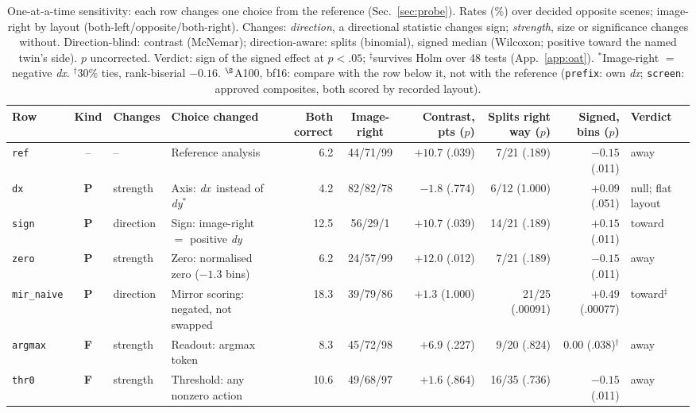 \documentclass[conference]{IEEEtran}
\newcommand{\dy}{\textit{dy}}
\newcommand{\dx}{\textit{dx}}
\newcommand{\rowid}[1]{\texttt{#1}}
\newcommand{\pit}{\textcolor{pitc}{\textbf{P}}}
\newcommand{\frk}{\textcolor{forkc}{\textbf{F}}}
\begin{document}
\begin{table}[t]
\centering
\scriptsize
\setlength{\tabcolsep}{2.2pt}
\caption{One-at-a-time sensitivity: each row changes one choice from the reference (Sec.~\ref{sec:probe}). Rates (\%) over decided opposite scenes; image-right by layout (both-left/opposite/both-right). Changes: \emph{direction}, a directional statistic changes sign; \emph{strength}, size or significance changes without. Direction-blind: contrast (McNemar); direction-aware: splits (binomial), signed median (Wilcoxon; positive toward the named twin's side). $p$ uncorrected. Verdict: sign of the signed effect at $p<.05$; $^\ddagger$survives Holm over 48 tests (App.~\ref{app:oat}). $^\ast$Image-right $=$ negative \dx. $^\dagger$30\% ties, rank-biserial $-0.16$. $^\S$A100, bf16: compare with the row below it, not with the reference (\rowid{prefix}: own \dx; \rowid{screen}: approved composites, both scored by recorded layout).}
\label{tab:oat}
\begin{tabular}{@{}l c l l r c r r r l@{}}
\toprule
Row & Kind & Changes & Choice changed & Both correct & Image-right & Contrast, pts ($p$) & Splits right way ($p$) & Signed, bins ($p$) & Verdict\\
\midrule
\rowid{ref} & -- & -- & Reference analysis & 6.2 & 44/71/99 & $+10.7$ (.039) & 7/21 (.189) & $-0.15$ (.011) & away\\
\midrule
\rowid{dx} & \pit & strength & Axis: \dx\ instead of \dy$^\ast$ & 4.2 & 82/82/78 & $-1.8$ (.774) & 6/12 (1.000) & $+0.09$ (.051) & null; flat layout\\
\rowid{sign} & \pit & direction & Sign: image-right $=$ positive \dy & 12.5 & 56/29/1 & $+10.7$ (.039) & 14/21 (.189) & $+0.15$ (.011) & toward\\
\rowid{zero} & \pit & strength & Zero: normalised zero ($-1.3$ bins) & 6.2 & 24/57/99 & $+12.0$ (.012) & 7/21 (.189) & $-0.15$ (.011) & away\\
\rowid{mir\_naive} & \pit & direction & Mirror scoring: negated, not swapped & 18.3 & 39/79/86 & $+1.3$ (1.000) & 21/25 (.00091) & $+0.49$ (.00077) & toward$^\ddagger$\\
\midrule
\rowid{argmax} & \frk & strength & Readout: argmax token & 8.3 & 45/72/98 & $+6.9$ (.227) & 9/20 (.824) & $0.00$ (.038)$^\dagger$ & away\\
\rowid{thr0} & \frk & strength & Threshold: any nonzero action & 10.6 & 49/68/97 & $+1.6$ (.864) & 16/35 (.736) & $-0.15$ (.011) & away\\

\end{tabular}
\end{table}
\end{document}
